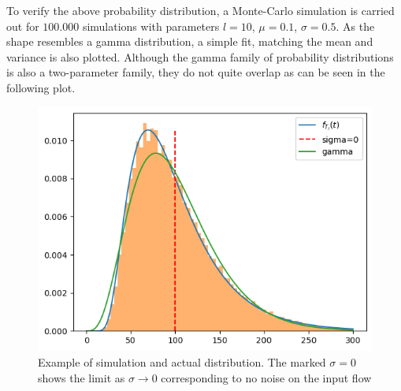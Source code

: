 \documentclass[../Thesis.tex]{subfiles}
\begin{document}
To verify the above probability distribution, a Monte-Carlo simulation is carried out for $100.000$ simulations with parameters $l=10$, $\mu = 0.1$, $\sigma = 0.5$. As the shape resembles a gamma distribution, a simple fit, matching the mean and variance is also plotted. Although the gamma family of probability distributions is also a two-parameter family, they do not quite overlap as can be seen in the following plot.

\begin{figure}[h]
    \centering
    \includegraphics[width=\linewidth]{figures/Brownian motion w. drift distribution and montecarlo.png}
    \caption{Example of simulation and actual distribution. The marked $\sigma=0$ shows the limit as $\sigma \to 0$ corresponding to no noise on the input flow}
    \label{fig:1}
\end{figure}
\end{document}
